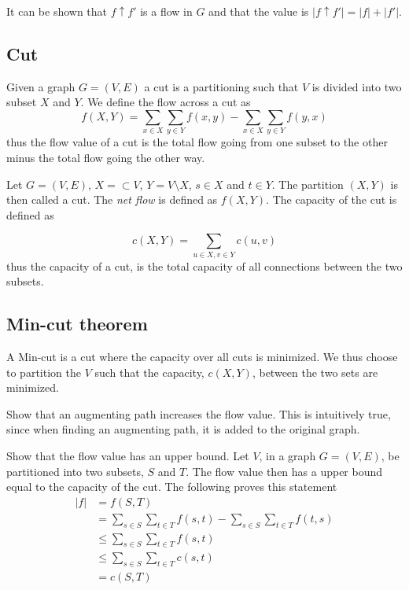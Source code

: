 \documentclass[10pt]{article}
\begin{document}
It can be shown that $f \uparrow f'$ is a flow in $G$ and that the value is $|f \uparrow f'| = |f| + |f'|$.

\subsection{Cut} %
\label{sub:cut}
Given a graph $G = (V,E)$ a cut is a partitioning such that $V$ is divided into two subset $X$ and $Y$. We define the flow across a cut as
\begin{equation}
  f(X,Y) = \sum_{x \in X} \sum_{y \in Y} f(x,y) - \sum_{x \in X} \sum_{y \in Y} f(y,x)
\end{equation} 
thus the flow value of a cut is the total flow going from one subset to the other minus the total flow going the other way.

Let $G = (V,E)$, $X  = \subset V$, $Y = V \setminus X$, $s \in X$ and $t \in Y$. The partition $(X,Y)$ is then called a cut. The \emph{net flow} is defined as $f(X,Y)$. The capacity of the cut is defined as

\begin{equation}
 c(X,Y) = \sum_{u \in X, v \in Y} c(u,v)
\end{equation}
thus the capacity of a cut, is the total capacity of all connections between the two subsets.


\subsection{Min-cut theorem} %
\label{sub:min_cut_theorem}
A Min-cut is a cut where the capacity over all cuts is minimized. We thus choose to partition the $V$ such that the capacity, $c(X,Y)$, between the two sets are minimized.

Show that an augmenting path increases the flow value. This is intuitively true, since when finding an augmenting path, it is added to the original graph.

Show that the flow value has an upper bound. Let $V$, in a graph $G = (V,E)$, be partitioned into two subsets, $S$ and $T$. The flow value then has a upper bound equal to the capacity of the cut. The following proves this statement
\begin{align*}
 |f| &= f(S,T)  \\ 
     &= \sum_{s \in S} \sum_{t \in T} f(s,t) - \sum_{s \in S} \sum_{t \in T} f(t,s) \\
     &\leq \sum_{s \in S} \sum_{t \in T} f(s,t) \\
     &\leq \sum_{s \in S} \sum_{t \in T} c(s,t) \\
     &= c(S,T)
\end{align*}
\end{document}
